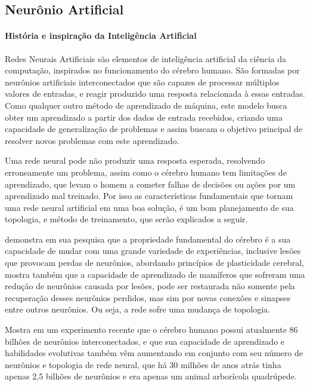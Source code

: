 \documentclass[	12pt, Times, openright, twoside, a4paper, english, brazil]{abntex2}
\begin{document}
        \subsection{Neurônio Artificial}
         
          \paragraph*{História e inspiração da Inteligência Artificial}
            Redes Neurais Artificiais são elementos de inteligência artificial da ciência da computação, inspirados no funcionamento do cérebro humano.
            São formadas por neurônios artificiais interconectados que são capazes de processar múltiplos valores de entradas, e reagir produzido uma resposta relacionada à essas entradas.
            Como qualquer outro método de aprendizado de máquina, este modelo busca obter um aprendizado a partir dos dados de entrada recebidos, criando uma capacidade de generalização de problemas e assim buscam o objetivo principal de resolver novos problemas com este aprendizado.

            Uma rede neural pode não produzir uma resposta esperada, resolvendo erroneamente um problema, assim como o cérebro humano tem limitações de aprendizado, que levam o homem a cometer falhas de decisões ou ações por um aprendizado mal treinado. Por isso as características fundamentais que tornam uma rede neural artificial em uma boa solução, é um bom planejamento de sua topologia, e método de treinamento, que serão explicados a seguir.

            \cite{Muhammad2014} demonstra em sua pesquisa que a propriedade fundamental do cérebro é a sua capacidade de mudar com uma grande variedade de experiências, inclusive lesões que provocam perdas de neurônios, abordando princípios de plasticidade cerebral, mostra também que a capacidade de aprendizado de mamíferos que sofreram uma redução de neurônios causada por lesões, pode ser restaurada não somente pela recuperação desses neurônios perdidos, mas sim por novas conexões e sinapses entre outros neurônios. Ou seja, a rede sofre uma mudança de topologia.

            \cite{Fapesp192} Mostra em um experimento recente que o cérebro humano possui atualmente 86 bilhões de neurônios interconectados, e que sua capacidade de aprendizado e habilidades evolutivas também vêm aumentando em conjunto com seu número de neurônios e topologia de rede neural, que há 30 milhões de anos atrás tinha apenas 2,5 bilhões de neurônios e era apenas um animal arborícola quadrúpede.
\end{document}
